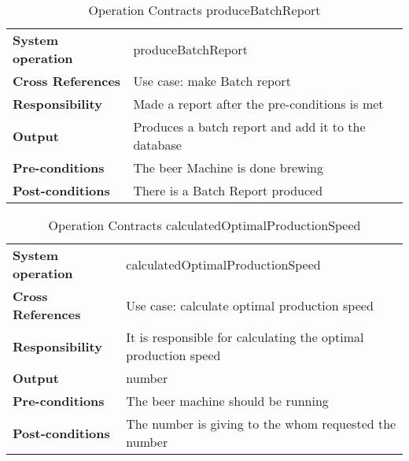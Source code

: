\begin{table}[H]
    \begin{tabularx}{\textwidth}{|>{\RaggedRight}p{3.7cm}|>{\RaggedRight}X|}
        \hline
        \multicolumn{2}{|c|}{\textbf{produceBatchReport}}\\
        \hline
        \textbf{System operation} & produceBatchReport\\
        \hline
        \textbf{Cross References} & Use case: make Batch report\\
        \hline
        \textbf{Responsibility} &  Made a report after the pre-conditions is met\\
        \hline
        \textbf{Output} & Produces a batch report and add it to the database\\
        \hline
        \textbf{Pre-conditions} & The beer Machine is done brewing\\
        \hline
        \textbf{Post-conditions} & There is a Batch Report produced\\
        \hline
    \end{tabularx}
    \caption{Operation Contracts produceBatchReport} 
    \label{table:Operation_Contracts_produceBatchReport}
\end{table}

\begin{table}[H]
    \begin{tabularx}{\textwidth}{|>{\RaggedRight}p{3.7cm}|>{\RaggedRight}X|}
        \hline
        \multicolumn{2}{|c|}{\textbf{calculatedOptimalProductionSpeed}}\\
        \hline
        \textbf{System operation} &calculatedOptimalProductionSpeed \\
        \hline
        \textbf{Cross References} & Use case: calculate optimal production speed\\
        \hline
        \textbf{Responsibility} & It is responsible for calculating the optimal 
        production speed \\
        \hline
        \textbf{Output} & number \\
        \hline
        \textbf{Pre-conditions} & The beer machine should be running\\
        \hline
        \textbf{Post-conditions} & The number is giving to the whom requested 
        the number \\
        \hline
    \end{tabularx}
    \caption{Operation Contracts calculatedOptimalProductionSpeed} 
    \label{table:Operation_Contracts_calculatedOptimalProductionSpeed}
\end{table}

